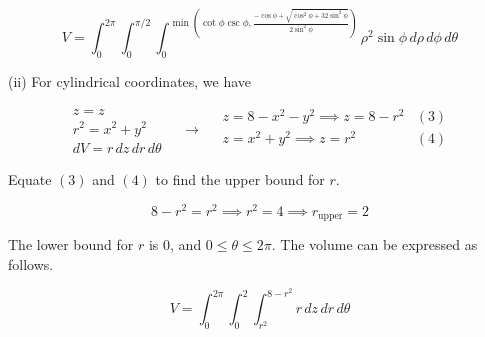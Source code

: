 \documentclass{article}
\begin{document}
\[\boxed{V=\displaystyle\int_0^{2\pi}\int_0^{\pi/2}\int_0^{\min\left(\cot\phi\csc\phi,\textstyle\frac{-\cos\phi+\sqrt{\cos^2\phi+32\sin^2\phi}}{2\sin^2\phi}\right)}\rho^2\sin\phi\,d\rho\,d\phi\,d\theta}\]

\hfill

\noindent (ii) For cylindrical coordinates, we have

\[
\begin{array}{c}
z=z\\
r^2=x^2+y^2\\
dV=r\,dz\,dr\,d\theta
\end{array}\quad\rightarrow\quad
\begin{array}{lc}
z=8-x^2-y^2\implies z=8-r^2 & (3)\\[1em]
z=x^2+y^2\implies z=r^2 & (4)\\
\end{array}
\]

\hfill

\noindent Equate $(3)$ and $(4)$ to find the upper bound for $r$.

\[8-r^2=r^2\implies r^2=4\implies r_{\text{upper}}=2\]

\hfill

\noindent The lower bound for $r$ is 0, and $0\leq\theta\leq2\pi$. The volume can be expressed as follows.

\[\boxed{V=\int_0^{2\pi}\int_0^2\int_{r^2}^{8-r^2}r\,dz\,dr\,d\theta}\]
\end{document}

